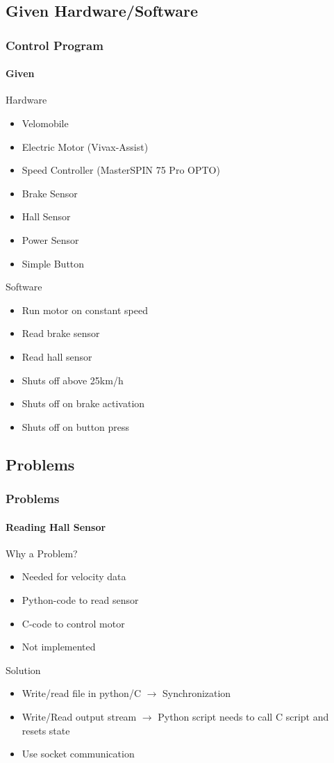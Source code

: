 \documentclass[8pt]{beamer}
\begin{document}
\subsection{Given Hardware/Software}
\begin{frame}
	\frametitle{Control Program}
	\framesubtitle{Given}
	\begin{block}{Hardware}
		\begin{itemize}
			\item Velomobile
			\item Electric Motor (Vivax-Assist)
			\item Speed Controller (MasterSPIN 75 Pro OPTO)
			\item Brake Sensor
			\item Hall Sensor
			\item Power Sensor
			\item Simple Button
		\end{itemize}
	\end{block}	
	\pause
	\begin{block}{Software}
		\begin{itemize}
			\item Run motor on constant speed
			\item Read brake sensor
			\item Read hall sensor
			\item Shuts off above 25km/h
			\item Shuts off on brake activation
			\item Shuts off on button press
		\end{itemize}
	\end{block}		
\end{frame}

\subsection{Problems}
\begin{frame}
	\frametitle{Problems}
	\framesubtitle{Reading Hall Sensor}
	\begin{block}{Why a Problem?}
	\begin{itemize}
		\item Needed for velocity data
		\item Python-code to read sensor
		\item C-code to control motor
		\item Not implemented
	\end{itemize}		
	\end{block}
	\pause
	\begin{block}{Solution}
		\begin{itemize}[<+->]
			\item Write/read file in python/C $\rightarrow$ Synchronization
			\item Write/Read output stream $\rightarrow$ Python script needs to call C script and resets state
			\item Use socket communication
		\end{itemize}
	\end{block}
\end{frame}
\end{document}
